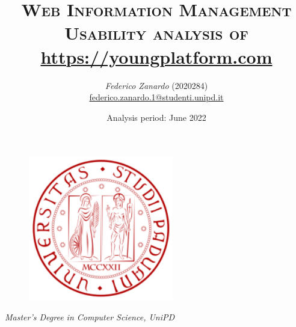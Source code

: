 \documentclass[12pt]{article}
\title{ \huge\textsc{Web Information Management} \\
		\large\textsc{Usability analysis of } \href{https://youngplatform.com}{https://youngplatform.com}}
\author{\textit{Federico Zanardo} (2020284) \\
\small \href{mailto:federico.zanardo.1@studenti.unipd.it}{federico.zanardo.1@studenti.unipd.it}}
\date{\small Analysis period: June 2022}
\renewcommand{\baselinestretch}{1.075}
\newcommand{\hr}{\par\vspace{-.1\ht\strutbox}\noindent\hrulefill\par}
\begin{document}
 

\begin{figure}[t!]
    \centering
    \includegraphics[height=17em]{res/images/logo.png}
\end{figure}

\maketitle 
\thispagestyle{empty}

\begin{center}
    \vspace{12em}
    \hr
    \textit{Master's Degree in Computer Science, UniPD}
\end{center}

\newpage
\renewcommand{\baselinestretch}{0.95}\normalsize
\tableofcontents
\renewcommand{\baselinestretch}{1.075}\normalsize

\newpage

\end{document}
